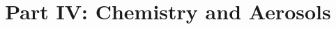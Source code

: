 \documentclass[12pt]{book}
\begin{document}


\title{Part IV: Chemistry and Aerosols}
\dominitoc
\tableofcontents






%
\end{document}
